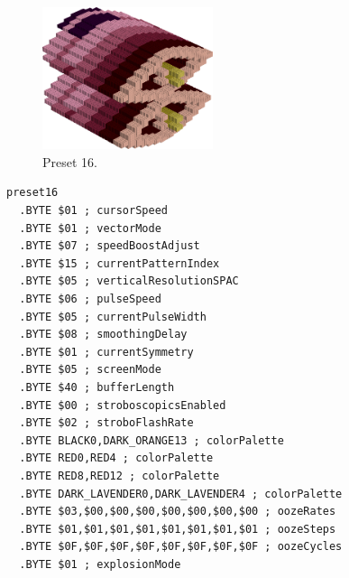 \begin{minipage}[b]{0.48\linewidth}
\begin{figure}[H]                                                          
  \centering                                                             
  \begin{adjustbox}{width=5cm,center}                                   
  \includegraphics[width=5cm]{src/colorspace_presets/preset16-45.png}%
  \end{adjustbox}                                                        
\caption*{Preset 16.}                                           
\end{figure}                                                               
\end{minipage}
\hspace{0.1cm}
\begin{minipage}[b]{0.48\linewidth}                                       
\begin{lstlisting}[basicstyle=\ttfamily\tiny]
preset16
  .BYTE $01 ; cursorSpeed
  .BYTE $01 ; vectorMode
  .BYTE $07 ; speedBoostAdjust
  .BYTE $15 ; currentPatternIndex
  .BYTE $05 ; verticalResolutionSPAC
  .BYTE $06 ; pulseSpeed
  .BYTE $05 ; currentPulseWidth
  .BYTE $08 ; smoothingDelay
  .BYTE $01 ; currentSymmetry
  .BYTE $05 ; screenMode
  .BYTE $40 ; bufferLength
  .BYTE $00 ; stroboscopicsEnabled
  .BYTE $02 ; stroboFlashRate
  .BYTE BLACK0,DARK_ORANGE13 ; colorPalette
  .BYTE RED0,RED4 ; colorPalette
  .BYTE RED8,RED12 ; colorPalette
  .BYTE DARK_LAVENDER0,DARK_LAVENDER4 ; colorPalette
  .BYTE $03,$00,$00,$00,$00,$00,$00,$00 ; oozeRates
  .BYTE $01,$01,$01,$01,$01,$01,$01,$01 ; oozeSteps
  .BYTE $0F,$0F,$0F,$0F,$0F,$0F,$0F,$0F ; oozeCycles
  .BYTE $01 ; explosionMode
\end{lstlisting}
\end{minipage}

